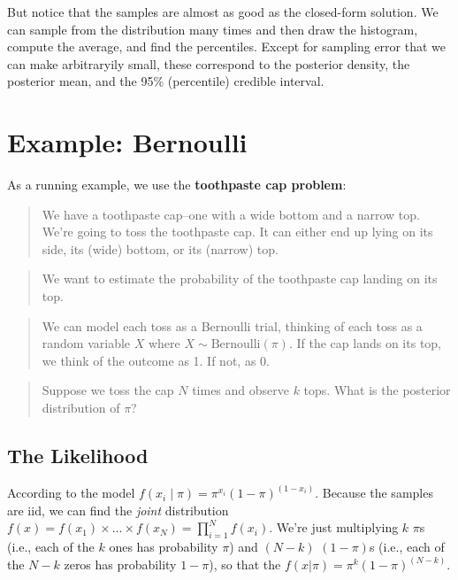 \documentclass[
]{book}
\begin{document}
But notice that the samples are almost as good as the closed-form
solution. We can sample from the distribution many times and then draw
the histogram, compute the average, and find the percentiles. Except for
sampling error that we can make arbitraryily small, these correspond to
the posterior density, the posterior mean, and the 95\% (percentile)
credible interval.

\hypertarget{example-bernoulli}{%
\section{Example: Bernoulli}\label{example-bernoulli}}

As a running example, we use the \textbf{toothpaste cap problem}:

\begin{quote}
We have a toothpaste cap--one with a wide bottom and a narrow top. We're
going to toss the toothpaste cap. It can either end up lying on its
side, its (wide) bottom, or its (narrow) top.
\end{quote}

\begin{quote}
We want to estimate the probability of the toothpaste cap landing on its
top.
\end{quote}

\begin{quote}
We can model each toss as a Bernoulli trial, thinking of each toss as a
random variable \(X\) where \(X \sim \text{Bernoulli}(\pi)\). If the cap
lands on its top, we think of the outcome as 1. If not, as 0.
\end{quote}

\begin{quote}
Suppose we toss the cap \(N\) times and observe \(k\) tops. What is the
posterior distribution of \(\pi\)?
\end{quote}

\hypertarget{likelihood}{%
\subsection{The Likelihood}\label{likelihood}}

According to the model
\(f(x_i \mid \pi) = \pi^{x_i} (1 - \pi)^{(1 - x_i)}\). Because the
samples are iid, we can find the \emph{joint} distribution
\(f(x) = f(x_1) \times ... \times f(x_N) = \prod_{i = 1}^N f(x_i)\).
We're just multiplying \(k\) \(\pi\)s (i.e., each of the \(k\) ones has
probability \(\pi\)) and \((N - k)\) \((1 - \pi)\)s (i.e., each of the
\(N - k\) zeros has probability \(1 - \pi\)), so that the
\(f(x | \pi) = \pi^{k} (1 - \pi)^{(N - k)}\).
\end{document}
